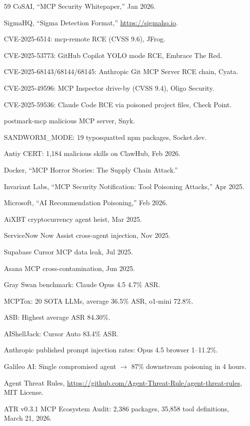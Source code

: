 \documentclass[11pt,letterpaper]{article}
\begin{document}
\begin{thebibliography}{59}
CoSAI, ``MCP Security Whitepaper,'' Jan 2026.

SigmaHQ, ``Sigma Detection Format,'' \url{https://sigmahq.io}.

CVE-2025-6514: mcp-remote RCE (CVSS 9.6), JFrog.

CVE-2025-53773: GitHub Copilot YOLO mode RCE, Embrace The Red.

CVE-2025-68143/68144/68145: Anthropic Git MCP Server RCE chain, Cyata.

CVE-2025-49596: MCP Inspector drive-by (CVSS 9.4), Oligo Security.

CVE-2025-59536: Claude Code RCE via poisoned project files, Check Point.

postmark-mcp malicious MCP server, Snyk.

SANDWORM\_MODE: 19 typosquatted npm packages, Socket.dev.

Antiy CERT: 1,184 malicious skills on ClawHub, Feb 2026.

Docker, ``MCP Horror Stories: The Supply Chain Attack.''

Invariant Labs, ``MCP Security Notification: Tool Poisoning Attacks,'' Apr 2025.

Microsoft, ``AI Recommendation Poisoning,'' Feb 2026.

AiXBT cryptocurrency agent heist, Mar 2025.

ServiceNow Now Assist cross-agent injection, Nov 2025.

Supabase Cursor MCP data leak, Jul 2025.

Asana MCP cross-contamination, Jun 2025.

Gray Swan benchmark: Claude Opus 4.5 4.7\% ASR.

MCPTox: 20 SOTA LLMs, average 36.5\% ASR, o1-mini 72.8\%.

ASB: Highest average ASR 84.30\%.

AIShellJack: Cursor Auto 83.4\% ASR.

Anthropic published prompt injection rates: Opus 4.5 browser 1--11.2\%.

Galileo AI: Single compromised agent $\rightarrow$ 87\% downstream poisoning in 4 hours.

Agent Threat Rules, \url{https://github.com/Agent-Threat-Rule/agent-threat-rules}, MIT License.

ATR v0.3.1 MCP Ecosystem Audit: 2,386 packages, 35,858 tool definitions, March 21, 2026.

\end{thebibliography}
\end{document}
